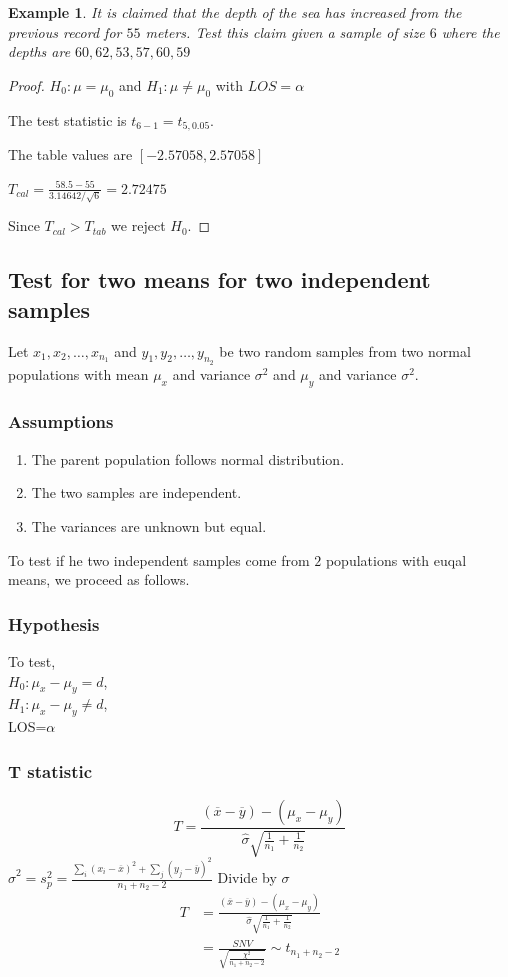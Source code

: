 \documentclass[oneside,11pt,pdftex]{book}%
\numberwithin{equation}{section}
\newtheorem{example}[theorem]{Example}
\numberwithin{section}{chapter}
\numberwithin{equation}{chapter}
\begin{document}
\begin{example}
	It is claimed that the depth of the sea has increased from the previous record for $ 55 $ meters. Test this claim given a sample of size $ 6 $ where the depths are $ 60, 62, 53, 57, 60, 59$
\end{example}
\begin{proof}
	$ H_0:\mu=\mu_0 $ and $ H_1:\mu \neq \mu_0 $ with $ LOS=\alpha $
	
	The test statistic is $ t_{6-1}=t_{5,0.05}$.
	
	The table values are $ [-2.57058, 2.57058] $
	
	$T_{cal}= \frac{58.5-55}{3.14642/\sqrt{6}}=2.72475$
	
	Since $ T_{cal} > T_{tab}$ we reject $ H_0 $.
\end{proof}

\subsection{Test for two means for two independent samples}
Let $ x_1, x_2,\dots,x_{n_1} $ and $ y_1,y_2,\dots,y_{n_2} $ be two random samples from two normal populations with mean $ \mu_x  $ and variance $ \sigma^2 $ and $ \mu_y  $ and variance $ \sigma^2 $.

\subsubsection{Assumptions}
\begin{enumerate}
	\item The parent population follows normal distribution.
	\item The two samples are independent.
	\item The variances are unknown but equal.
\end{enumerate}
To test if he two independent samples come from $ 2 $ populations with euqal means, we proceed as follows.

\subsubsection{Hypothesis}
To test,\\
$ H_0:\mu_x-\mu_y=d $,\\
$ H_1:\mu_x - \mu_y \neq d $,\\
LOS=$ \alpha $

\subsubsection{T statistic}
\[ T=\frac{(\overline{x}-\overline{y})-(\mu_x-\mu_y)}{\hat{\sigma}\sqrt{\frac{1}{n_1}+\frac{1}{n_2}}} \]
$ \hat{\sigma}^2=s_p^2= \frac{\sum_i (x_i-\overline{x})^2+\sum_j(y_j-\overline{y})^2}{n_1+n_2-2}$
Divide by $ \sigma $
\begin{align*}
	T&=\frac{(\overline{x}-\overline{y})-(\mu_x-\mu_y)}{\hat{\sigma}\sqrt{\frac{1}{n_1}+\frac{1}{n_2}}}\\
	&=\frac{SNV}{\sqrt{\frac{\chi^2}{n_1+n_2-2}}} \sim t_{n_1+n_2-2}
\end{align*}
\end{document}
